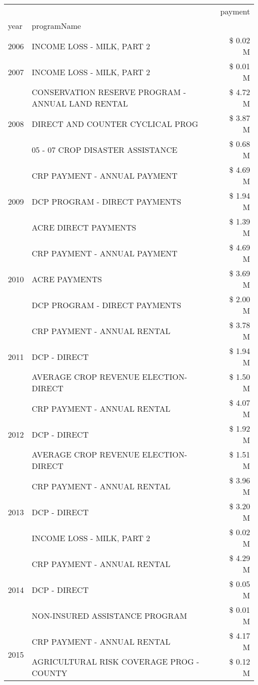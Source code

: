 \begin{tabular}{llr}
\toprule
 &  & payment \\
year & programName &  \\
\midrule
2006 & INCOME LOSS - MILK, PART 2 & \$ 0.02 M \\
\cline{1-3}
2007 & INCOME LOSS - MILK, PART 2 & \$ 0.01 M \\
\cline{1-3}
\multirow[t]{3}{*}{2008} & CONSERVATION RESERVE PROGRAM - ANNUAL LAND RENTAL & \$ 4.72 M \\
 & DIRECT AND COUNTER CYCLICAL PROG & \$ 3.87 M \\
 & 05 - 07 CROP DISASTER ASSISTANCE & \$ 0.68 M \\
\cline{1-3}
\multirow[t]{3}{*}{2009} & CRP PAYMENT - ANNUAL PAYMENT & \$ 4.69 M \\
 & DCP PROGRAM - DIRECT PAYMENTS & \$ 1.94 M \\
 & ACRE DIRECT PAYMENTS & \$ 1.39 M \\
\cline{1-3}
\multirow[t]{3}{*}{2010} & CRP PAYMENT - ANNUAL PAYMENT & \$ 4.69 M \\
 & ACRE PAYMENTS & \$ 3.69 M \\
 & DCP PROGRAM - DIRECT PAYMENTS & \$ 2.00 M \\
\cline{1-3}
\multirow[t]{3}{*}{2011} & CRP PAYMENT - ANNUAL RENTAL & \$ 3.78 M \\
 & DCP - DIRECT & \$ 1.94 M \\
 & AVERAGE CROP REVENUE ELECTION-DIRECT & \$ 1.50 M \\
\cline{1-3}
\multirow[t]{3}{*}{2012} & CRP PAYMENT - ANNUAL RENTAL & \$ 4.07 M \\
 & DCP - DIRECT & \$ 1.92 M \\
 & AVERAGE CROP REVENUE ELECTION-DIRECT & \$ 1.51 M \\
\cline{1-3}
\multirow[t]{3}{*}{2013} & CRP PAYMENT - ANNUAL RENTAL & \$ 3.96 M \\
 & DCP - DIRECT & \$ 3.20 M \\
 & INCOME LOSS - MILK, PART 2 & \$ 0.02 M \\
\cline{1-3}
\multirow[t]{3}{*}{2014} & CRP PAYMENT - ANNUAL RENTAL & \$ 4.29 M \\
 & DCP - DIRECT & \$ 0.05 M \\
 & NON-INSURED ASSISTANCE PROGRAM & \$ 0.01 M \\
\cline{1-3}
\multirow[t]{3}{*}{2015} & CRP PAYMENT - ANNUAL RENTAL & \$ 4.17 M \\
 & AGRICULTURAL RISK COVERAGE PROG - COUNTY & \$ 0.12 M \\

\end{tabular}
